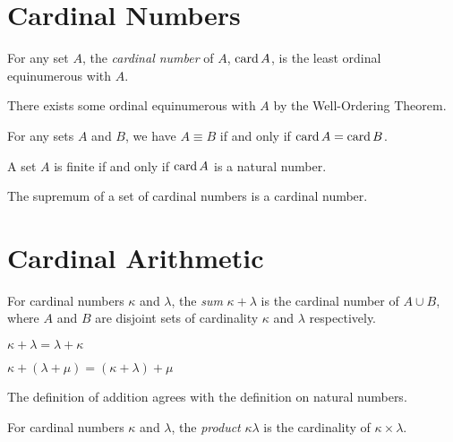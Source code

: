 \section{Cardinal Numbers}

\begin{definition}
    For any set $A$, the \emph{cardinal number} of $A$, $\operatorname{card} A$, is the least ordinal
    equinumerous with $A$.

    There exists some ordinal equinumerous with $A$ by the Well-Ordering Theorem.
\end{definition}

\begin{theorem}
    For any sets $A$ and $B$, we have $A \equiv B$ if and only if $\operatorname{card} A = \operatorname{card} B$.
\end{theorem}

\begin{theorem}
    A set $A$ is finite if and only if $\operatorname{card} A$ is a natural number.
\end{theorem}

\begin{theorem}
    The supremum of a set of cardinal numbers is a cardinal number.
\end{theorem}

\section{Cardinal Arithmetic}

\begin{definition}
    For cardinal numbers $\kappa$ and $\lambda$, the \emph{sum} $\kappa + \lambda$
    is the cardinal number of $A \cup B$, where $A$ and $B$ are disjoint sets
    of cardinality $\kappa$ and $\lambda$ respectively.
\end{definition}

\begin{theorem}
    $\kappa + \lambda = \lambda + \kappa$
\end{theorem}

\begin{theorem}
    $\kappa + (\lambda + \mu) = (\kappa + \lambda) + \mu$
\end{theorem}

\begin{theorem}
    The definition of addition agrees with the definition on natural numbers.
\end{theorem}

\begin{definition}
    For cardinal numbers $\kappa$ and $\lambda$, the \emph{product}
    $\kappa \lambda$ is the cardinality of $\kappa \times \lambda$.
\end{definition}

